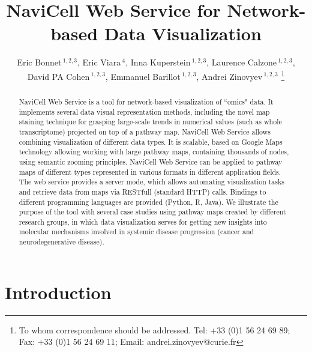 \documentclass[a4,center,fleqn]{NAR}
\begin{document}
\title{NaviCell Web Service for Network-based Data Visualization}


\author{%
Eric Bonnet\,$^{1,2,3}$,
Eric Viara\,$^{4}$,
Inna Kuperstein\,$^{1,2,3}$,
Laurence Calzone\,$^{1,2,3}$,
David PA Cohen\,$^{1,2,3}$,
Emmanuel Barillot\,$^{1,2,3}$,
Andrei Zinovyev\,$^{1,2,3}$%
\footnote{To whom correspondence should be addressed.
Tel: +33 (0)1 56 24 69 89; Fax: +33 (0)1 56 24 69 11; Email: andrei.zinovyev@curie.fr}}

\address{%
$^{1}$Institut Curie, 26 rue d'Ulm, 75248 Paris, France,
$^{2}$INSERM U900, 75248 Paris, France,
$^{3}$Mines ParisTech, 77300 Fontainebleau, France,
$^{4}$Sysra, 91330 Yerres, France.
}




\maketitle

\begin{abstract}
NaviCell Web Service is a tool for network-based visualization of
``omics" data.  It implements several data visual representation methods,
including the novel map staining technique for grasping large-scale
trends in numerical values (such as whole transcriptome) projected on top of a
pathway map. NaviCell Web Service allows combining visualization of different data types.
It is scalable, based on Google Maps technology allowing working with large pathway maps,
containing thousands of nodes, using semantic zooming principles.
NaviCell Web Service can be applied to pathway maps of different
types represented in various formats in different application fields.
The web service provides a server mode, which allows automating
visualization tasks and retrieve data from maps via RESTfull (standard HTTP)
calls.  Bindings to different programming languages are provided (Python,
R, Java). We illustrate the purpose of the tool  with  several case studies using pathway maps created by different research groups,
in which data visualization serves for getting new insights into molecular mechanisms
involved in systemic disease progression (cancer and neurodegenerative disease).
\end{abstract}


\section{Introduction}
\end{document}
